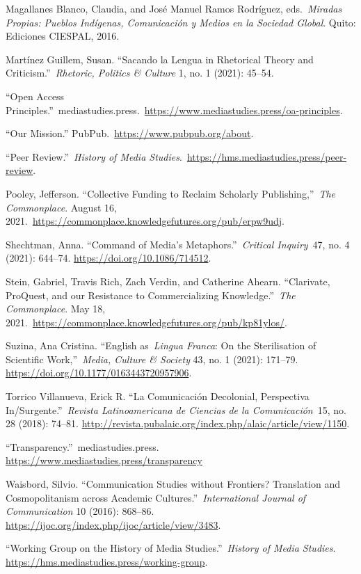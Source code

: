 \documentclass{tufte-handout}
\begin{document}
\begin{hangparas}{.25in}{1}
Magallanes Blanco, Claudia, and José Manuel Ramos Rodríguez,
eds.~\emph{Miradas Propias: Pueblos Indígenas, Comunicación y Medios en
la Sociedad Global}. Quito: Ediciones CIESPAL, 2016.

Martínez Guillem, Susan. ``Sacando la Lengua in Rhetorical Theory and
Criticism.''~\emph{Rhetoric, Politics \& Culture} 1, no. 1 (2021):
45--54.

``Open Access
Principles.''~mediastudies.press.~\url{https://www.mediastudies.press/oa-principles}.

``Our Mission.'' PubPub.~\url{https://www.pubpub.org/about}.

``Peer Review.''~\emph{History of Media
Studies}.~\url{https://hms.mediastudies.press/peer-review}.

Pooley, Jefferson. ``Collective Funding to Reclaim Scholarly
Publishing,''~\emph{The Commonplace}. August 16,
2021.~\url{https://commonplace.knowledgefutures.org/pub/erpw9udj}.

Shechtman, Anna. ``Command of Media's Metaphors.''~\emph{Critical
Inquiry}~47, no. 4 (2021): 644--74.
\url{https://doi.org/10.1086/714512}.

Stein, Gabriel, Travis Rich, Zach Verdin, and Catherine Ahearn.
``Clarivate, ProQuest, and our Resistance to Commercializing
Knowledge.''~\emph{The Commonplace}. May 18,
2021.~\url{https://commonplace.knowledgefutures.org/pub/kp81ylos/}.

Suzina, Ana Cristina. ``English as~\emph{Lingua Franca}: On the
Sterilisation of Scientific Work,''~\emph{Media, Culture \& Society} 43,
no. 1 (2021): 171--79. \url{https://doi.org/10.1177/0163443720957906}.

Torrico Villanueva, Erick R. ``La Comunicación Decolonial, Perspectiva
In/Surgente.''~\emph{Revista Latinoamericana de Ciencias de la
Comunicación}~15, no. 28 (2018): 74--81.
\url{http://revista.pubalaic.org/index.php/alaic/article/view/1150}.

``Transparency.''~mediastudies.press.
\url{https://www.mediastudies.press/transparency}

Waisbord, Silvio. ``Communication Studies without Frontiers? Translation
and Cosmopolitanism across Academic Cultures.''~\emph{International
Journal of Communication} 10 (2016): 868--86.
\url{https://ijoc.org/index.php/ijoc/article/view/3483}.

``Working Group on the History of Media Studies.''~\emph{History of
Media Studies}. \url{https://hms.mediastudies.press/working-group}.



\end{hangparas}
\end{document}
